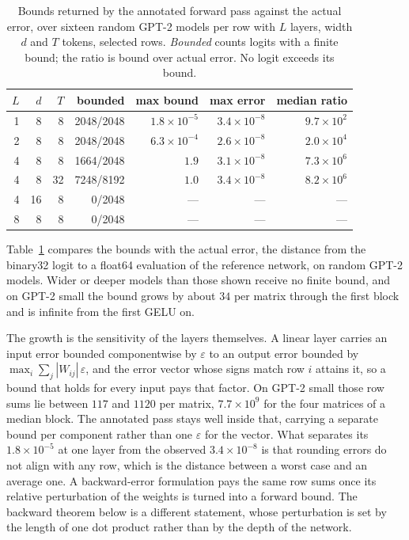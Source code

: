 \documentclass[11pt]{article}
\theoremstyle{plain}
\theoremstyle{definition}
\begin{document}
\begin{table}[t]
\centering
\small
\begin{tabular}{rrrrrrr}
\toprule
$L$ & $d$ & $T$ & \textbf{bounded} & \textbf{max bound} & \textbf{max error} & \textbf{median ratio} \\
\midrule
1 & 8  & 8  & 2048/2048 & $1.8\times10^{-5}$ & $3.4\times10^{-8}$ & $9.7\times10^{2}$ \\
2 & 8  & 8  & 2048/2048 & $6.3\times10^{-4}$ & $2.6\times10^{-8}$ & $2.0\times10^{4}$ \\
4 & 8  & 8  & 1664/2048 & $1.9$              & $3.1\times10^{-8}$ & $7.3\times10^{6}$ \\
4 & 8  & 32 & 7248/8192 & $1.0$              & $3.4\times10^{-8}$ & $8.2\times10^{6}$ \\
4 & 16 & 8  & 0/2048    & ---                & ---                & --- \\
8 & 8  & 8  & 0/2048    & ---                & ---                & --- \\
\bottomrule
\end{tabular}
\caption{Bounds returned by the annotated forward pass against the actual
error, over sixteen random GPT-2 models per row with $L$ layers, width $d$ and
$T$ tokens, selected rows. \emph{Bounded} counts logits with a finite bound; the
ratio is bound over actual error. No logit exceeds its bound.}
\label{tab:bound}
\end{table}

Table~\ref{tab:bound} compares the bounds with the actual error, the distance
from the binary32 logit to a float64 evaluation of the reference network, on
random GPT-2 models. Wider or deeper models than those shown receive no finite
bound, and on GPT-2 small the bound grows by about $34$ per matrix through the
first block and is infinite from the first GELU on.

The growth is the sensitivity of the layers themselves. A linear layer carries
an input error bounded componentwise by $\varepsilon$ to an output error
bounded by $\max_i \sum_j |W_{ij}|\,\varepsilon$, and the error vector whose
signs match row $i$ attains it, so a bound that holds for every input pays that
factor. On GPT-2 small those row sums lie between $117$ and $1120$ per matrix,
$7.7\times10^{9}$ for the four matrices of a median block. The annotated pass
stays well inside that, carrying a separate bound per component rather than
one $\varepsilon$ for the vector. What separates its $1.8\times10^{-5}$ at one
layer from the observed $3.4\times10^{-8}$ is that rounding errors do not align
with any row, which is the distance between a worst case and an average one. A
backward-error formulation pays the same row sums once its relative
perturbation of the weights is turned into a forward bound. The backward
theorem below is a different statement, whose perturbation is set by the length
of one dot product rather than by the depth of the network.
\end{document}
